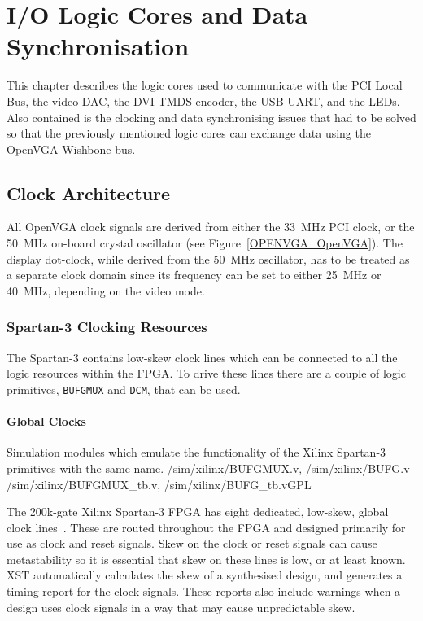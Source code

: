\chapter{I/O Logic Cores and Data Synchronisation}
\label{IO_Chapter}

This chapter describes the logic cores used to communicate with the PCI Local
Bus, the video DAC, the DVI TMDS encoder, the USB UART, and the LEDs. Also
contained is the clocking and data synchronising issues that had to be solved so
that the previously mentioned logic cores can exchange data using the OpenVGA
Wishbone bus.


\section{Clock Architecture}
\label{CLOCK}
All OpenVGA clock signals are derived from either the 33~MHz PCI clock, or the
50~MHz on-board crystal oscillator (see Figure~\ref{OPENVGA_OpenVGA}). The
display dot-clock, while derived from the 50~MHz oscillator, has to be treated as a
separate clock domain since its frequency can be set to either 25~MHz or 40~MHz,
depending on the video mode.


\subsection{Spartan-3 Clocking Resources}

The Spartan-3 contains low-skew clock lines which can be connected to all the
logic resources within the FPGA. To drive these lines there are a couple of logic
primitives, \texttt{BUFGMUX} and \texttt{DCM}, that can be used.


\subsubsection{Global Clocks}

{Simulation modules which emulate the functionality of the Xilinx Spartan-3
primitives with the same name.} {/sim/xilinx/BUFGMUX.v, /sim/xilinx/BUFG.v}
{/sim/xilinx/BUFGMUX\_tb.v, /sim/xilinx/BUFG\_tb.v}{GPL}

The 200k-gate Xilinx Spartan-3 FPGA has eight dedicated, low-skew, global clock
lines~\cite{Xilinx_SP3_DS}. These are routed throughout the FPGA and designed
primarily for use as clock and reset signals. Skew on the clock or reset signals
can cause metastability so it is essential that skew on these lines is low, or at
least known. XST automatically calculates the skew of a synthesised design, and
generates a timing report for the clock signals. These reports also include
warnings when a design uses clock signals in a way that may cause unpredictable
skew.

